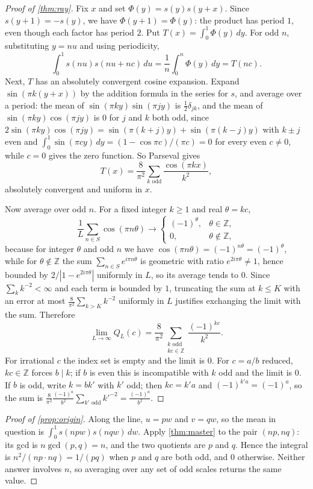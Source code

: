 \documentclass[11pt]{amsart}
\theoremstyle{definition}
\theoremstyle{remark}
\begin{document}
\begin{proof}[Proof of \cref{thm:ray}]
Fix $x$ and set $\Phi(y)=s(y)s(y+x)$. Since $s(y+1)=-s(y)$, we have $\Phi(y+1)=\Phi(y)$: the product has period $1$, even though each factor has period $2$. Put $T(x)=\int_0^1\Phi(y)\,dy$. For odd $n$, substituting $y=nu$ and using periodicity,
\[
\int_0^1 s(nu)s(nu+nc)\,du=\frac1n\int_0^n\Phi(y)\,dy=T(nc).
\]
Next, $T$ has an absolutely convergent cosine expansion. Expand $\sin(\pi k(y+x))$ by the addition formula in the series for $s$, and average over a period: the mean of $\sin(\pi ky)\sin(\pi jy)$ is $\tfrac12\delta_{jk}$, and the mean of $\sin(\pi ky)\cos(\pi jy)$ is $0$ for $j$ and $k$ both odd, since $2\sin(\pi ky)\cos(\pi jy)=\sin(\pi(k+j)y)+\sin(\pi(k-j)y)$ with $k\pm j$ even and $\int_0^1\sin(\pi cy)\,dy=(1-\cos\pi c)/(\pi c)=0$ for every even $c\ne0$, while $c=0$ gives the zero function. So Parseval gives
\[
T(x)=\frac{8}{\pi^2}\sum_{k\text{ odd}}\frac{\cos(\pi kx)}{k^2},
\]
absolutely convergent and uniform in $x$.

Now average over odd $n$. For a fixed integer $k\ge1$ and real $\theta=kc$,
\[
\frac1L\sum_{n\in S}\cos(\pi n\theta)\longrightarrow
\begin{cases}(-1)^{\theta}, & \theta\in\mathbb Z,\\ 0,&\theta\notin\mathbb Z,\end{cases}
\]
because for integer $\theta$ and odd $n$ we have $\cos(\pi n\theta)=(-1)^{n\theta}=(-1)^\theta$, while for $\theta\notin\mathbb Z$ the sum $\sum_{n\in S}e^{i\pi n\theta}$ is geometric with ratio $e^{2i\pi\theta}\ne1$, hence bounded by $2/|1-e^{2i\pi\theta}|$ uniformly in $L$, so its average tends to $0$. Since $\sum_k k^{-2}<\infty$ and each term is bounded by $1$, truncating the sum at $k\le K$ with an error at most $\frac{8}{\pi^2}\sum_{k>K}k^{-2}$ uniformly in $L$ justifies exchanging the limit with the sum. Therefore
\[
\lim_{L\to\infty}Q_L(c)=\frac{8}{\pi^2}\sum_{\substack{k\text{ odd}\\ kc\in\mathbb Z}}\frac{(-1)^{kc}}{k^2}.
\]
For irrational $c$ the index set is empty and the limit is $0$. For $c=a/b$ reduced, $kc\in\mathbb Z$ forces $b\mid k$; if $b$ is even this is incompatible with $k$ odd and the limit is $0$. If $b$ is odd, write $k=bk'$ with $k'$ odd; then $kc=k'a$ and $(-1)^{k'a}=(-1)^a$, so the sum is $\frac{8}{\pi^2}\frac{(-1)^a}{b^2}\sum_{k'\text{ odd}}k'^{-2}=\frac{(-1)^a}{b^2}$.
\end{proof}

\begin{proof}[Proof of \cref{prop:origin}]
Along the line, $u=pw$ and $v=qw$, so the mean in question is $\int_0^1 s(npw)s(nqw)\,dw$. Apply \cref{thm:master} to the pair $(np,nq)$: its gcd is $n\gcd(p,q)=n$, and the two quotients are $p$ and $q$. Hence the integral is $n^2/(np\cdot nq)=1/(pq)$ when $p$ and $q$ are both odd, and $0$ otherwise. Neither answer involves $n$, so averaging over any set of odd scales returns the same value.
\end{proof}
\end{document}
